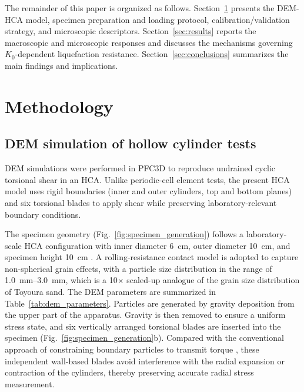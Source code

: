\documentclass[a4paper,fleqn]{cas-sc}
\newcommand{\Kzero}{\ensuremath{K_0}}
\begin{document}
The remainder of this paper is organized as follows. Section~\ref{sec:methodology} presents the DEM-HCA model, specimen preparation and loading protocol, calibration/validation strategy, and microscopic descriptors. Section~\ref{sec:results} reports the macroscopic and microscopic responses and discusses the mechanisms governing \Kzero{}-dependent liquefaction resistance. Section~\ref{sec:conclusions} summarizes the main findings and implications.
 \section{Methodology}
\label{sec:methodology}

\subsection{DEM simulation of hollow cylinder tests}
\label{subsec:dem_hca}

DEM simulations were performed in \textsc{PFC3D} \citep{Itasca2021} to reproduce undrained cyclic torsional shear in an HCA. Unlike periodic-cell element tests, the present HCA model uses rigid boundaries (inner and outer cylinders, top and bottom planes) and six torsional blades to apply shear while preserving laboratory-relevant boundary conditions.

The specimen geometry (Fig.~\ref{fig:specimen_generation}) follows a laboratory-scale HCA configuration with inner diameter \SI{6}{cm}, outer diameter \SI{10}{cm}, and specimen height \SI{10}{cm} \citep{Vargas2020}. A rolling-resistance contact model \citep{IwashitaOda1998,WensrichKatterfeld2012} is adopted to capture non-spherical grain effects, with a particle size distribution in the range of \SIrange{1.0}{3.0}{mm}, which is a 10$\times$ scaled-up analogue of the grain size distribution of Toyoura sand. The DEM parameters are summarized in Table~\ref{tab:dem_parameters}. Particles are generated by gravity deposition from the upper part of the apparatus. Gravity is then removed to ensure a uniform stress state, and six vertically arranged torsional blades are inserted into the specimen (Fig.~\ref{fig:specimen_generation}b). Compared with the conventional approach of constraining boundary particles to transmit torque \citep[e.g.,][]{Li2014,Liu2021}, these independent wall-based blades avoid interference with the radial expansion or contraction of the cylinders, thereby preserving accurate radial stress measurement.
\end{document}
